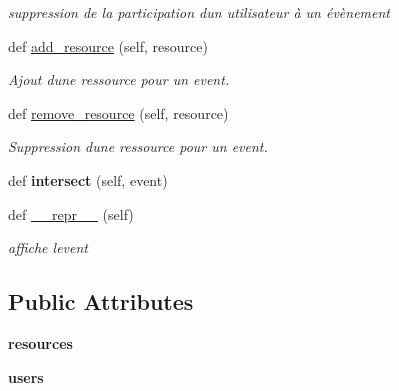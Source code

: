 \begin{DoxyCompactItemize}
\begin{DoxyCompactList}\small\item\em suppression de la participation d\textquotesingle{}un utilisateur à un évènement \end{DoxyCompactList}\item 
\mbox{\label{classSource_1_1core_1_1event_1_1Event_ae197fc2b7904a8b564da48208da1e78b}} 
def \mbox{\hyperlink{classSource_1_1core_1_1event_1_1Event_ae197fc2b7904a8b564da48208da1e78b}{add\+\_\+resource}} (self, resource)
\begin{DoxyCompactList}\small\item\em Ajout d\textquotesingle{}une ressource pour un event. \end{DoxyCompactList}\item 
\mbox{\label{classSource_1_1core_1_1event_1_1Event_a7162c0262b2c90d79e0b84e6f92b4115}} 
def \mbox{\hyperlink{classSource_1_1core_1_1event_1_1Event_a7162c0262b2c90d79e0b84e6f92b4115}{remove\+\_\+resource}} (self, resource)
\begin{DoxyCompactList}\small\item\em Suppression d\textquotesingle{}une ressource pour un event. \end{DoxyCompactList}\item 
\mbox{\label{classSource_1_1core_1_1event_1_1Event_abb47ab9b43b636aa0bb781954d9e23ec}} 
def {\bfseries intersect} (self, event)
\item 
\mbox{\label{classSource_1_1core_1_1event_1_1Event_af71ff5b923f293bae949cbfd45f31cb4}} 
def \mbox{\hyperlink{classSource_1_1core_1_1event_1_1Event_af71ff5b923f293bae949cbfd45f31cb4}{\+\_\+\+\_\+repr\+\_\+\+\_\+}} (self)
\begin{DoxyCompactList}\small\item\em affiche l\textquotesingle{}event \end{DoxyCompactList}\end{DoxyCompactItemize}
\subsection*{Public Attributes}
\begin{DoxyCompactItemize}
\item 
\mbox{\label{classSource_1_1core_1_1event_1_1Event_a3e2d19a56e162169c6ea568ea8d8efd4}} 
{\bfseries resources}
\item 
\mbox{\label{classSource_1_1core_1_1event_1_1Event_a8a1b2f9cf2b7cf5f8785f0784aea8b66}} 
{\bfseries users}
\end{DoxyCompactItemize}
